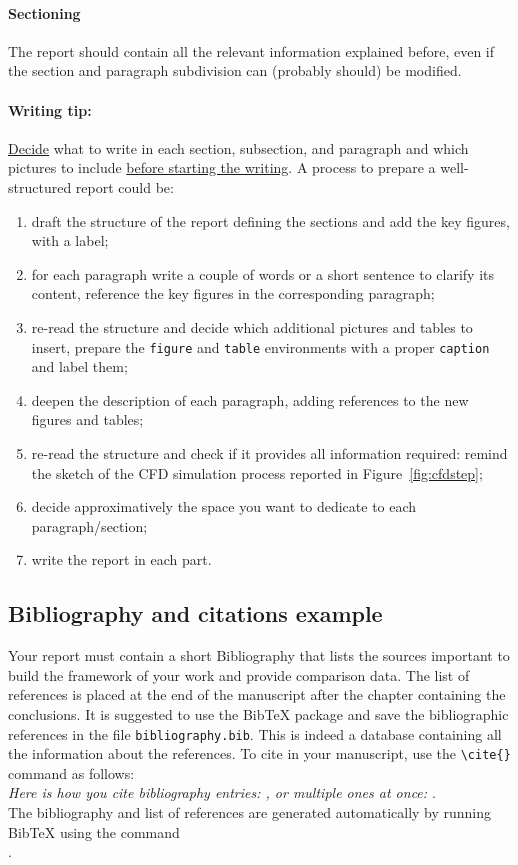 \documentclass[11pt,a4paper]{article}
\begin{document}
\paragraph{Sectioning}
The report should contain all the relevant information explained before, even if the section and paragraph subdivision can (probably should) be modified. 

\paragraph{Writing tip:} \underline{Decide} what to write in each section, subsection, and paragraph and which pictures to include \underline{before starting the writing}.
A process to prepare a well-structured report could be:
\begin{enumerate}
    \item draft the structure of the report defining the sections and add the key figures, with a label;
    \item for each paragraph write a couple of words or a short sentence to clarify its content, reference the key figures in the corresponding paragraph;
    \item re-read the structure and decide which additional pictures and tables to insert, prepare the \texttt{figure} and \texttt{table} environments with a proper \texttt{caption} and label them;
    \item deepen the description of each paragraph, adding references to the new figures and tables;
    \item re-read the structure and check if it provides all information required: remind the sketch of the CFD simulation process reported in Figure~\ref{fig:cfdstep};
    \item decide approximatively the space you want to dedicate to each paragraph/section;
    \item write the report in each part.
\end{enumerate}



\subsection{Bibliography and citations example}
Your report must contain a short Bibliography that lists the sources important to build the framework of your work and provide comparison data.
The list of references is placed at the end of the manuscript after the chapter containing the conclusions.
It is suggested to use the BibTeX package and save the bibliographic references in the file \verb|bibliography.bib|.
This is indeed a database containing all the information about the references. To cite in your manuscript, use the \verb|\cite{}| command as follows:
\\
\textit{Here is how you cite bibliography entries: \cite{knuth74}, or multiple ones at once: \cite{knuth92,lamport94}}.
\\
The bibliography and list of references are generated automatically by running BibTeX \cite{bibtex} using the command \\ \verb||.
\end{document}
